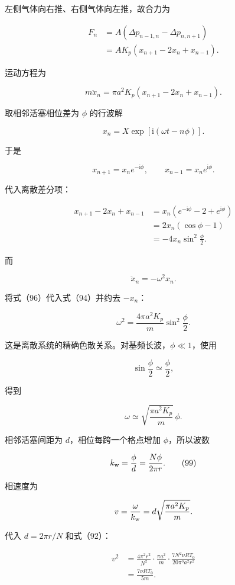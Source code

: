 \documentclass[12pt,a4paper,UTF8]{ctexart}
\begin{document}
左侧气体向右推、右侧气体向左推，故合力为

\[\begin{aligned}
F_n
&=A\left(\Delta p_{n-1,n}-\Delta p_{n,n+1}\right)\\
&=AK_p\left(x_{n+1}-2x_n+x_{n-1}\right).
\end{aligned}\]

运动方程为

\[m\ddot x_n=\pi a^2K_p
\left(x_{n+1}-2x_n+x_{n-1}\right). \tag{94}\]

取相邻活塞相位差为 \(\phi\) 的行波解

\[x_n=X\exp[\mathrm i(\omega t-n\phi)]. \tag{95}\]

于是

\[x_{n+1}=x_ne^{-\mathrm i\phi},\qquad
x_{n-1}=x_ne^{\mathrm i\phi}.\]

代入离散差分项：

\[\begin{aligned}
x_{n+1}-2x_n+x_{n-1}
&=x_n(e^{-\mathrm i\phi}-2+e^{\mathrm i\phi})\\
&=2x_n(\cos\phi-1)\\
&=-4x_n\sin^2\frac\phi2.
\end{aligned} \tag{96}\]

而

\[\ddot x_n=-\omega^2x_n.\]

将式（96）代入式（94）并约去 \(-x_n\)：

\[\omega^2=\frac{4\pi a^2K_p}{m}\sin^2\frac\phi2. \tag{97}\]

这是离散系统的精确色散关系。对基频长波，\(\phi\ll1\)，使用

\[\sin\frac\phi2\simeq\frac\phi2,\]

得到

\[\omega\simeq\sqrt{\frac{\pi a^2K_p}{m}}\,\phi. \tag{98}\]

相邻活塞间距为 \(d\)，相位每跨一个格点增加 \(\phi\)，所以波数

\[k_{\rm w}=\frac\phi d=\frac{N\phi}{2\pi r}. \tag{99}\]

相速度为

\[v=\frac\omega{k_{\rm w}}
=d\sqrt{\frac{\pi a^2K_p}{m}}.\]

代入 \(d=2\pi r/N\) 和式（92）：

\[\begin{aligned}
v^2
&=\frac{4\pi^2r^2}{N^2}
\cdot\frac{\pi a^2}{m}
\cdot\frac{7N^2\nu RT_0}{20\pi^3a^2r^2}\\
&=\frac{7\nu RT_0}{5m}.
\end{aligned}\]
\end{document}
